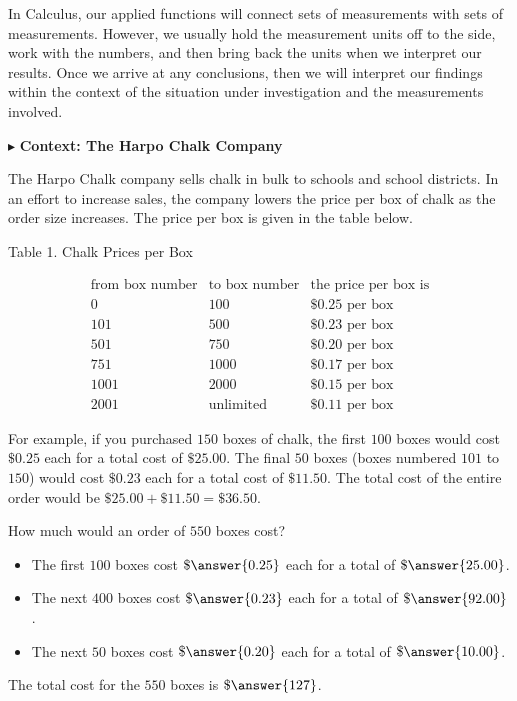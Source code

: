 \documentclass{ximera}
\begin{document}
In Calculus, our applied functions will connect sets of measurements with sets of measurements. However, we usually hold the measurement units off to the side, work with the numbers, and then bring back the units when we interpret our results.  Once we arrive at any conclusions, then we will interpret our findings within the context of the situation under investigation and the measurements involved. 




$\blacktriangleright$ \textbf{Context: The Harpo Chalk Company} 

The Harpo Chalk company sells chalk in bulk to schools and school districts. In an effort to increase sales, the company lowers the price per box of chalk as the order size increases.  The price per box is given in the table below. 




Table 1. Chalk Prices per Box

\[
\begin{array}{lll}
\text{from box number} & \text{to box number}  & \text{the price per box is} \\
0 &  100 &  \$0.25 \text{ per box}   \\
101 &  500 &  \$0.23 \text{ per box}   \\
501 &  750 &  \$0.20 \text{ per box}   \\
751 &  1000 &  \$0.17 \text{ per box}   \\
1001 &  2000 &  \$0.15 \text{ per box}   \\
2001 &  \text{unlimited} &  \$0.11 \text{ per box}   
\end{array}
\]




For example, if you purchased $150$ boxes of chalk, the first $100$ boxes would cost $\$0.25$ each for a total cost of $\$25.00$.  The final $50$ boxes (boxes numbered $101$ to $150$) would cost $\$0.23$ each for a total cost of $\$11.50$.  The total cost of the entire order would be $\$25.00 + \$11.50 = \$36.50$.


\begin{question}

How much would an order of $550$ boxes cost?



\begin{itemize}
\item The first $100$ boxes cost $\$\answer{0.25}$ each for a total of $\$\answer{25.00}$.
\item The next $400$ boxes cost $\$\answer{0.23}$ each for a total of $\$\answer{92.00}$.
\item The next $50$ boxes cost $\$\answer{0.20}$ each for a total of $\$\answer{10.00}$.
\end{itemize}

The total cost for the $550$ boxes is $\$\answer{127}$.

\end{question}
\end{document}
